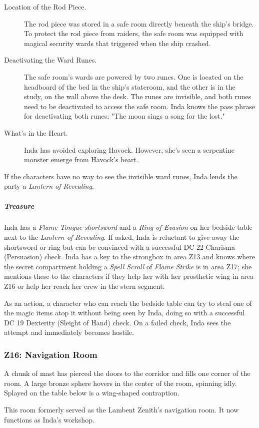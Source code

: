 \documentclass[10pt,a4paper,twoside,bg=print,twocolumn,openany,nodeprecatedcode]{dndbook}
\begin{document}
\begin{description}
\item[Location of the Rod Piece.]
The rod piece was stored in a safe room directly beneath the ship's bridge. To protect the rod piece from raiders, the safe room was equipped with magical security wards that triggered when the ship crashed.
\item[Deactivating the Ward Runes.]
The safe room's wards are powered by two runes. One is located on the headboard of the bed in the ship's stateroom, and the other is in the study, on the wall above the desk. The runes are invisible, and both runes need to be deactivated to access the safe room. Inda knows the pass phrase for deactivating both runes: "The moon sings a song for the lost."
\item[What's in the Heart.]
Inda has avoided exploring Havock. However, she's seen a serpentine monster emerge from Havock's heart.
\end{description}

If the characters have no way to see the invisible ward runes, Inda lends the party a \textit{Lantern of Revealing}.

\subparagraph{Treasure}
Inda has a \textit{Flame Tongue shortsword} and a \textit{Ring of Evasion} on her bedside table next to the \textit{Lantern of Revealing}. If asked, Inda is reluctant to give away the shortsword or ring but can be convinced with a successful DC 22 Charisma (Persuasion) check. Inda has a key to the strongbox in area Z13 and knows where the secret compartment holding a \textit{Spell Scroll} of \textit{Flame Strike} is in area Z17; she mentions these to the characters if they help her with her prosthetic wing in area Z16 or help her reach her crew in the stern segment.

As an action, a character who can reach the bedside table can try to steal one of the magic items atop it without being seen by Inda, doing so with a successful DC 19 Dexterity (Sleight of Hand) check. On a failed check, Inda sees the attempt and immediately becomes hostile.

\subsubsection{Z16: Navigation Room}
\begin{DndReadAloud}{}
A chunk of mast has pierced the doors to the corridor and fills one corner of the room. A large bronze sphere hovers in the center of the room, spinning idly. Splayed on the table below is a wing-shaped contraption.

This room formerly served as the Lambent Zenith's navigation room. It now functions as Inda's workshop.

\end{DndReadAloud}
\end{document}
